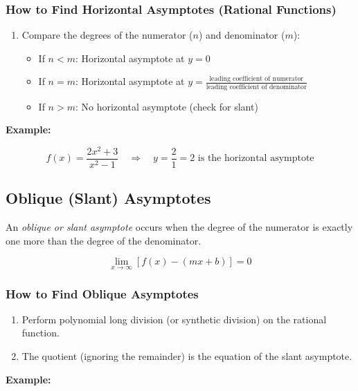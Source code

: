 \subsubsection{How to Find Horizontal Asymptotes (Rational Functions)}

\begin{enumerate}
    \item Compare the degrees of the numerator (\(n\)) and denominator (\(m\)):
    \begin{itemize}[label=\(-\)]
        \item If \(n < m\): Horizontal asymptote at \(y = 0\)
        \item If \(n = m\): Horizontal asymptote at \(y = \frac{\text{leading coefficient of numerator}}{\text{leading coefficient of denominator}}\)
        \item If \(n > m\): No horizontal asymptote (check for slant)
    \end{itemize}
\end{enumerate}

\textbf{Example:}
\vspace{\baselineskip}

\[
f(x) = \frac{2x^2 + 3}{x^2 - 1} \quad \Rightarrow \quad y = \frac{2}{1} = 2 \text{ is the horizontal asymptote}
\]

\subsection{Oblique (Slant) Asymptotes}

An \emph{oblique or slant asymptote} occurs when the degree of the numerator is exactly one more than the degree of the denominator.

\[
\lim_{x \to \infty} [f(x) - (mx + b)] = 0
\]

\subsubsection{How to Find Oblique Asymptotes}

\begin{enumerate}
    \item Perform polynomial long division (or synthetic division) on the rational function.
    \item The quotient (ignoring the remainder) is the equation of the slant asymptote.
\end{enumerate}

\textbf{Example:}
\vspace{\baselineskip}

